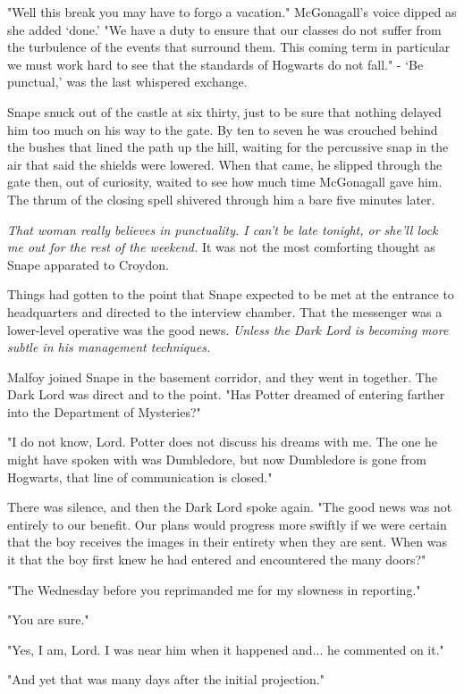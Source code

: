 "Well this break you may have to forgo a vacation." McGonagall's voice dipped as she added `done.' "We have a duty to ensure that our classes do not suffer from the turbulence of the events that surround them. This coming term in particular we must work hard to see that the standards of Hogwarts do not fall." - `Be punctual,' was the last whispered exchange.

Snape snuck out of the castle at six thirty, just to be sure that nothing delayed him too much on his way to the gate. By ten to seven he was crouched behind the bushes that lined the path up the hill, waiting for the percussive snap in the air that said the shields were lowered. When that came, he slipped through the gate then, out of curiosity, waited to see how much time McGonagall gave him. The thrum of the closing spell shivered through him a bare five minutes later.

\emph{That woman really believes in punctuality. I can't be late tonight, or she'll lock me out for the rest of the weekend.} It was not the most comforting thought as Snape apparated to Croydon.

Things had gotten to the point that Snape expected to be met at the entrance to headquarters and directed to the interview chamber. That the messenger was a lower-level operative was the good news. \emph{Unless the Dark Lord is becoming more subtle in his management techniques.}

Malfoy joined Snape in the basement corridor, and they went in together. The Dark Lord was direct and to the point. "Has Potter dreamed of entering farther into the Department of Mysteries?"

"I do not know, Lord. Potter does not discuss his dreams with me. The one he might have spoken with was Dumbledore, but now Dumbledore is gone from Hogwarts, that line of communication is closed."

There was silence, and then the Dark Lord spoke again. "The good news was not entirely to our benefit. Our plans would progress more swiftly if we were certain that the boy receives the images in their entirety when they are sent. When was it that the boy first knew he had entered and encountered the many doors?"

"The Wednesday before you reprimanded me for my slowness in reporting."

"You are sure."

"Yes, I am, Lord. I was near him when it happened and... he commented on it."

"And yet that was many days after the initial projection."

